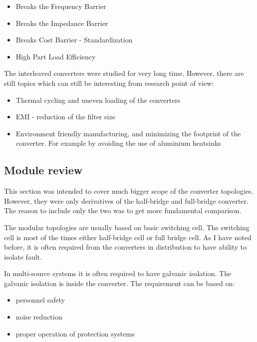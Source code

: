 \documentclass[]{scrartcl}
\newenvironment{remark}[1][Remark]{\begin{trivlist}
		\item[\hskip \labelsep {\bfseries #1}]}{\end{trivlist}}
\begin{document}
\begin{itemize}
	\item Breaks the Frequency Barrier
	\item Breaks the Impedance Barrier
	\item Breaks Cost Barrier - Standardization
	\item High Part Load Efficiency
\end{itemize}

The interleaved converters were studied for very long time. However, there are still topics which can still be interesting from research point of view:

\begin{itemize}
	\item Thermal cycling and uneven loading of the converters
	\item EMI - reduction of the filter size
	\item Environment friendly manufacturing, and minimizing the footprint of the converter. For example by avoiding the use of aluminium heatsinks \cite{Popovic-Gerber2011} 
\end{itemize}



\subsection{Module  review}
\begin{remark}
	This section was intended to cover much bigger scope of the converter topologies. However, they were only derivatives of the half-bridge and full-bridge converter. The reason to include only the two was to get more fundamental comparison. 
\end{remark}

The modular topologies are usually based on basic switching cell. The switching cell is most of the times either half-bridge cell or full bridge cell. As I have noted before, it is often required from the converters in distribution to have ability to isolate fault. 

In multi-source systems it is often required to have galvanic isolation. The galvanic isolation is inside the converter. The requirement can be based on\cite{Karshenas2011}: 
\begin{itemize}
	\item personnel safety 
	\item noise reduction
	\item proper operation of protection systems
\end{itemize}
\end{document}
